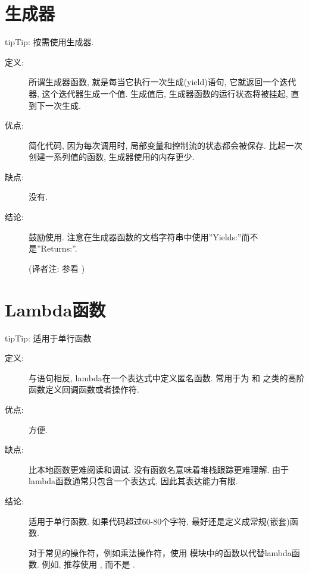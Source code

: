 \documentclass[a4paper,10pt,english]{sphinxmanual}
\begin{document}
\section{生成器}
\label{\detokenize{python_language_rules:id7}}
\begin{sphinxadmonition}{tip}{Tip:}
按需使用生成器.
\end{sphinxadmonition}
\begin{description}
\item[{定义:}] \leavevmode
所谓生成器函数, 就是每当它执行一次生成(yield)语句, 它就返回一个迭代器, 这个迭代器生成一个值. 生成值后, 生成器函数的运行状态将被挂起, 直到下一次生成.

\item[{优点:}] \leavevmode
简化代码, 因为每次调用时, 局部变量和控制流的状态都会被保存. 比起一次创建一系列值的函数, 生成器使用的内存更少.

\item[{缺点:}] \leavevmode
没有.

\item[{结论:}] \leavevmode
鼓励使用. 注意在生成器函数的文档字符串中使用”Yields:”而不是”Returns:”.

(译者注: 参看 {\hyperref[\detokenize{python_style_rules:comments}]{}} )

\end{description}


\section{Lambda函数}
\label{\detokenize{python_language_rules:lambda}}
\begin{sphinxadmonition}{tip}{Tip:}
适用于单行函数
\end{sphinxadmonition}
\begin{description}
\item[{定义:}] \leavevmode
与语句相反, lambda在一个表达式中定义匿名函数. 常用于为  和  之类的高阶函数定义回调函数或者操作符.

\item[{优点:}] \leavevmode
方便.

\item[{缺点:}] \leavevmode
比本地函数更难阅读和调试. 没有函数名意味着堆栈跟踪更难理解. 由于lambda函数通常只包含一个表达式, 因此其表达能力有限.

\item[{结论:}] \leavevmode
适用于单行函数. 如果代码超过60-80个字符, 最好还是定义成常规(嵌套)函数.

对于常见的操作符，例如乘法操作符，使用  模块中的函数以代替lambda函数. 例如, 推荐使用  , 而不是  .

\end{description}
\end{document}
